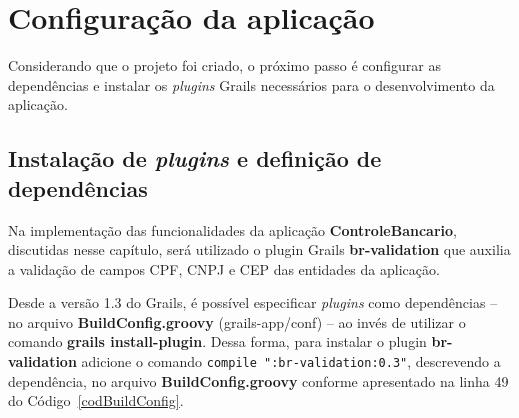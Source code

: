 \section{Configuração da aplicação} 

\vspace{0.5cm}

Considerando  que  o  projeto  foi  criado,  o próximo  passo  é  configurar  as
dependências   e  instalar   os  {\it   plugins}  Grails   necessários   para  o
desenvolvimento da aplicação.  

\subsection{Instalação     de      {\it     plugins}     e      definição     de
  dependências}\label{secPlugins}

\vspace{0.5cm}

Na  implementação  das  funcionalidades  da  aplicação  {\bf  ControleBancario},
discutidas nesse  capítulo, será utilizado  o plugin Grails  {\bf br-validation}
que auxilia a validação de campos CPF, CNPJ e CEP das entidades da aplicação. 

Desde  a  versão  1.3 do  Grails,  é  possível  especificar {\it  plugins}  como
dependências  -- no  arquivo  {\bf BuildConfig.groovy}  (grails-app/conf) --  ao
invés  de utilizar  o comando  {\bf grails  install-plugin}.  Dessa  forma, para
instalar     o    plugin    {\bf     br-validation}    adicione     o    comando
\texttt{compile  ":br-validation:0.3"}, descrevendo  a  dependência, no  arquivo
       {\bf   BuildConfig.groovy}   conforme   apresentado   na  linha   49   do
       Código~\ref{codBuildConfig}.  
  

